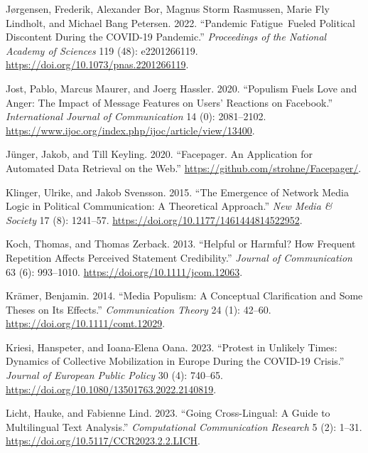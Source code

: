 \documentclass[
]{ccr}
\newlength{\cslhangindent}
\newlength{\cslentryspacingunit} %
\newenvironment{CSLReferences}[2] %
 {%
  \setlength{\parindent}{0pt}
  \ifodd #1
  \let\oldpar\par
  \def\par{\hangindent=\cslhangindent\oldpar}
  \fi
  \setlength{\parskip}{#2\cslentryspacingunit}
 }%
 {}
\begin{document}
\begin{CSLReferences}{1}{0}
\leavevmode{}%
Jørgensen, Frederik, Alexander Bor, Magnus Storm Rasmussen, Marie Fly
Lindholt, and Michael Bang Petersen. 2022. {``Pandemic Fatigue~Fueled
Political Discontent During the {COVID-19} Pandemic.''}
\emph{Proceedings of the National Academy of Sciences} 119 (48):
e2201266119. \url{https://doi.org/10.1073/pnas.2201266119}.

\leavevmode{}%
Jost, Pablo, Marcus Maurer, and Joerg Hassler. 2020. {``Populism Fuels
Love and Anger: {The} Impact of Message Features on Users' Reactions on
{Facebook}.''} \emph{International Journal of Communication} 14 (0):
2081--2102.
\url{https://www.ijoc.org/index.php/ijoc/article/view/13400}.

\leavevmode{}%
Jünger, Jakob, and Till Keyling. 2020. {``Facepager. {An} Application
for Automated Data Retrieval on the Web.''}
\url{https://github.com/strohne/Facepager/}.

\leavevmode{}%
Klinger, Ulrike, and Jakob Svensson. 2015. {``The Emergence of Network
Media Logic in Political Communication: {A} Theoretical Approach.''}
\emph{New Media \& Society} 17 (8): 1241--57.
\url{https://doi.org/10.1177/1461444814522952}.

\leavevmode{}%
Koch, Thomas, and Thomas Zerback. 2013. {``Helpful or Harmful? {How}
Frequent Repetition Affects Perceived Statement Credibility.''}
\emph{Journal of Communication} 63 (6): 993--1010.
\url{https://doi.org/10.1111/jcom.12063}.

\leavevmode{}%
Krämer, Benjamin. 2014. {``Media Populism: {A} Conceptual Clarification
and Some Theses on Its Effects.''} \emph{Communication Theory} 24 (1):
42--60. \url{https://doi.org/10.1111/comt.12029}.

\leavevmode{}%
Kriesi, Hanspeter, and Ioana-Elena Oana. 2023. {``Protest in Unlikely
Times: Dynamics of Collective Mobilization in {Europe} During the
{COVID-19} Crisis.''} \emph{Journal of European Public Policy} 30 (4):
740--65. \url{https://doi.org/10.1080/13501763.2022.2140819}.

\leavevmode{}%
Licht, Hauke, and Fabienne Lind. 2023. {``Going Cross-Lingual: {A} Guide
to Multilingual Text Analysis.''} \emph{Computational Communication
Research} 5 (2): 1--31. \url{https://doi.org/10.5117/CCR2023.2.2.LICH}.


\end{CSLReferences}
\end{document}
